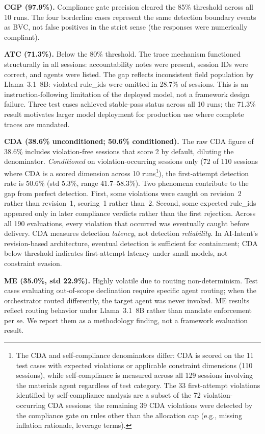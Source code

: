 \documentclass[runningheads]{llncs}
\begin{document}
\textbf{CGP (97.9\%).} Compliance gate precision cleared the 85\%
threshold across all 10 runs. The four borderline cases represent the
same detection boundary events as BVC, not false positives in the strict
sense (the responses were numerically compliant).

\textbf{ATC (71.3\%).} Below the 80\% threshold. The trace mechanism
functioned structurally in all sessions: accountability notes were
present, session IDs were correct, and agents were listed. The gap
reflects inconsistent field population by Llama~3.1~8B: violated
rule\_ids were omitted in 28.7\% of sessions. This is an
instruction-following limitation of the deployed model, not a framework
design failure. Three test cases achieved stable-pass status across all
10 runs; the 71.3\% result motivates larger model deployment for
production use where complete traces are mandated.

\textbf{CDA (38.6\% unconditioned; 50.6\% conditioned).} The raw CDA
figure of 38.6\% includes violation-free sessions that score 2 by
default, diluting the denominator. \emph{Conditioned} on
violation-occurring sessions only (72 of 110 sessions where CDA is a
scored dimension across 10 runs\footnote{The CDA and self-compliance
denominators differ: CDA is scored on the 11 test cases with expected
violations or applicable constraint dimensions (110 sessions), while
self-compliance is measured across all 129 sessions involving the
materials agent regardless of test category. The 33 first-attempt
violations identified by self-compliance analysis are a subset of the
72 violation-occurring CDA sessions; the remaining 39 CDA violations
were detected by the compliance gate on rules other than the allocation
cap (e.g., missing inflation rationale, leverage terms).}), the
first-attempt
detection rate is 50.6\% (std 5.3\%,
range 41.7--58.3\%). Two phenomena contribute to the gap from perfect
detection. First, some violations were caught on revision~2 rather than
revision~1, scoring~1 rather than~2. Second, some expected rule\_ids
appeared only in later compliance verdicts rather than the first
rejection. Across all 190 evaluations, every violation that occurred
was eventually caught before delivery. CDA measures detection
\emph{latency}, not detection \emph{reliability}. In AI-Intent's
revision-based architecture, eventual detection is sufficient for
containment; CDA below threshold indicates first-attempt latency
under small models, not constraint evasion.

\textbf{ME (35.0\%, std 22.9\%).} Highly volatile due to routing
non-determinism. Test cases evaluating out-of-scope declination require
specific agent routing; when the orchestrator routed differently, the
target agent was never invoked. ME results reflect routing behavior under
Llama~3.1~8B rather than mandate enforcement per se. We report them as
a methodology finding, not a framework evaluation result.
\end{document}
